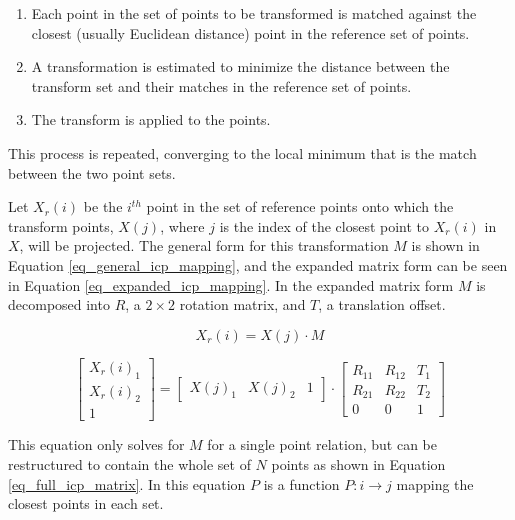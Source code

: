 \documentclass[sigconf]{acmart}
\begin{document}
\begin{enumerate}
	\item Each point in the set of points to be transformed is matched against the closest (usually Euclidean distance) point in the reference set of points.
	\item A transformation is estimated to minimize the distance between the transform set and their matches in the reference set of points.
	\item The transform is applied to the points.
\end{enumerate}

This process is repeated, converging to the local minimum that is the match between the two point sets.

Let $X_r(i)$ be the $i^{th}$ point in the set of reference points onto which the transform points, $X(j)$, where $j$ is the index of the closest point to $X_r(i)$ in $X$, will be projected. The general form for this transformation $M$ is shown in Equation \ref{eq_general_icp_mapping}, and the expanded matrix form can be seen in Equation \ref{eq_expanded_icp_mapping}. In the expanded matrix form $M$ is decomposed into $R$, a $2 \times 2$ rotation matrix, and $T$, a translation offset.

\begin{equation}
X_r(i) = X(j) \cdot M
\label{eq_general_icp_mapping}
\end{equation}

\begin{equation}
\begin{bmatrix}
X_r(i)_1 \\
X_r(i)_2 \\
1 
\end{bmatrix}
=
\begin{bmatrix}
X(j)_1 & X(j)_2 & 1
\end{bmatrix}
\cdot
\begin{bmatrix}
R_{11} & R_{12} & T_1 \\
R_{21} & R_{22} & T_2 \\
0 & 0 & 1
\end{bmatrix}
\label{eq_expanded_icp_mapping}
\end{equation}

This equation only solves for $M$ for a single point relation, but can be restructured to contain
the whole set of $N$ points as shown in Equation \ref{eq_full_icp_matrix}. In this equation $P$ is a function $P: i \rightarrow j$ mapping the closest points in each set.
\end{document}
